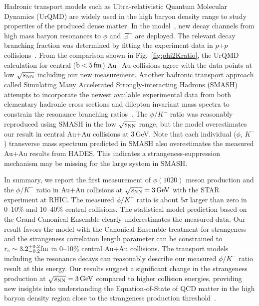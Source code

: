 \documentclass[%
 reprint,	
showpacs,
 amsmath,amssymb,
 aps,
 prc,
]{revtex4-1}
\begin{document}
Hadronic transport models such as Ultra-relativistic Quantum Molecular Dynamics (UrQMD) are widely used in the high baryon density range to study properties of the produced dense matter. In the model~\cite{Steinheimer_2015_UrQMD}, new decay channels from high mass baryon resonances to $\phi$ and $\Xi^-$ are deployed. The relevant decay branching fraction was determined by fitting the experiment data in $p$+$p$ collisions~\cite{ANKE_phi}. From the comparison shown in Fig.~\ref{fig:phi2Kratio}, the UrQMD calculation for central ($\rm{b}<5\,\rm{fm}$) Au+Au collisions agree with the data points at low ${\sqrt{s_{\rm NN}}}$ including our new measurement. 
Another hadronic transport approach called Simulating Many Accelerated Strongly-interacting Hadrons (SMASH) attempts to incorporate the newest available experimental data from both elementary hadronic cross sections and dilepton invariant mass spectra to constrain the resonance branching ratios~\cite{Elfner_SMASH}. The $\phi/K^-$ ratio was reasonably reproduced using SMASH in the low ${\sqrt{s_{\rm NN}}}$ range, but the model overestimates our result in central Au+Au collisions at 3\,GeV. Note that each individual ($\phi$, $K^-$) transverse mass spectrum predicted in SMASH also overestimates the measured Au+Au results from HADES.
This indicates a strangeness-suppression mechanism may be missing for the large system in SMASH.

In summary, we report the first measurement of $\phi(1020)$ meson production and the $\phi/K^-$ ratio in Au+Au collisions at ${\sqrt{s_{\rm NN}} = \rm{3\,GeV}}$ with the STAR experiment at RHIC. The measured $\phi/K^-$ ratio is about $5\sigma$ larger than zero in 0--10\% and 10--40\% central collisions. The statistical model prediction based on the Grand Canonical Ensemble clearly underestimates the measured data. Our result favors the model with the Canonical Ensemble treatment for strangeness and the strangeness correlation length parameter can be constrained to $r_c \sim 3.2_{-0.2}^{+0.2} \rm{fm}$ in 0--10\% central Au+Au collisions. The transport models including the resonance decays can reasonably describe our measured $\phi/K^-$ ratio result at this energy. Our results suggest a significant change in the strangeness production at ${\sqrt{s_{\rm NN}} = \rm{3\,GeV}}$ compared to higher collision energies, providing new insights into understanding the Equation-of-State of QCD matter in the high baryon density region close to the strangeness production threshold~\cite{KO_sQM17}. 
\end{document}
